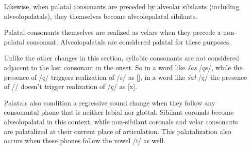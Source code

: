 \documentclass[a4paper,11pt,oneside,openany]{memoir}
\newcommand{\bripa}[1]{[#1]}
\newcommand{\phipa}[1]{/#1/}
\begin{document}
Likewise, when palatal consonants are preceded by alveolar sibilants (including alveolopalatals), they themselves become alveolopalatal sibilants.

\begin{center}
\end{center}

Palatal consonants themselves are realized as velars when they precede a non-palatal consonant. Alveolopalatals are considered palatal for these purposes. 

\begin{center}
\end{center}
\noindent Unlike the other changes in this section, syllabic consonants are not considered adjacent to the last consonant in the onset. So in a word like \textit{\'sas} \phipa{ç\schwa s\lamino}, while the presence of \phipa{ç} triggers realization of \phipa{s\lamino} as \bripa{\alvpalesh}, in a word like \textit{\'sa\l} \phipa{ç\schwa\latfric\lamino} the presence of \phipa{\latfric\lamino} doesn't trigger realization of \phipa{ç} as \bripa{x}.

Palatals also condition a regressive sound change when they follow any consonantal phone that is neither labial nor glottal. Sibilant coronals become alveolopalatal in this context, while non-sibilant coronals and velar consonants are palatalized at their current place of articulation. This palatalization also occurs when these phones follow the vowel \phipa{i} as well.
\end{document}
